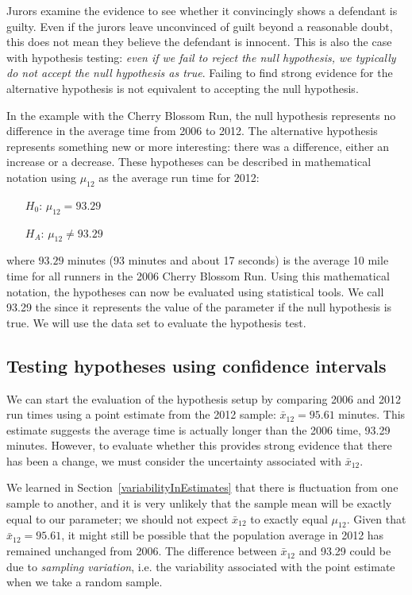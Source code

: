 Jurors examine the evidence to see whether it convincingly shows a defendant is guilty. Even if the jurors leave unconvinced of guilt beyond a reasonable doubt, this does not mean they believe the defendant is innocent. This is also the case with hypothesis testing: \emph{even if we fail to reject the null hypothesis, we typically do not accept the null hypothesis as true}. Failing to find strong evidence for the alternative hypothesis is not equivalent to accepting the null hypothesis.

In the example with the Cherry Blossom Run, the null hypothesis represents no difference in the average time from 2006 to 2012. The alternative hypothesis represents something new or more interesting: there was a difference, either an increase or a decrease. These hypotheses can be described in mathematical notation using $\mu_{12}$ as the average run time for 2012:
\begin{itemize}
\setlength{\itemsep}{0mm}
\item[$H_0$:] $\mu_{12} = 93.29$ %
\item[$H_A$:] $\mu_{12} \neq 93.29$
\end{itemize}
where $93.29$ minutes (93 minutes and about 17 seconds) is the average 10 mile time for all runners in the 2006 Cherry Blossom Run. Using this mathematical notation, the hypotheses can now be evaluated using statistical tools. We call 93.29 the  since it represents the value of the parameter if the null hypothesis is true. We will use the  data set to evaluate the hypothesis test.


\subsection{Testing hypotheses using confidence intervals}
\label{utilizingOurCI}

We can start the evaluation of the hypothesis setup by comparing 2006 and 2012 run times using a point estimate from the 2012 sample: $\bar{x}_{12} = 95.61$ minutes. This estimate suggests the average time is actually longer than the 2006 time, 93.29 minutes. However, to evaluate whether this provides strong evidence that there has been a change, we must consider the uncertainty associated with $\bar{x}_{12}$.

We learned in Section~\ref{variabilityInEstimates} that there is fluctuation from one sample to another, and it is very unlikely that the sample mean will be exactly equal to our parameter; we should not expect $\bar{x}_{12}$ to exactly equal $\mu_{12}$. Given that $\bar{x}_{12} = 95.61$, it might still be possible that the population average in 2012 has remained unchanged from 2006. The difference between $\bar{x}_{12}$ and 93.29 could be due to \emph{sampling variation}, i.e. the variability associated with the point estimate when we take a random sample.


